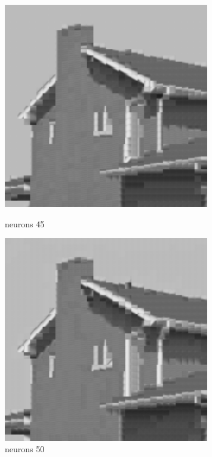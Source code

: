 \documentclass[../IDP_Task5_Karwowski_Kowalewski.tex]{subfiles}
\begin{document}
{{        \begin{figure}[!htbp]
            \begin{minipage}[c]{0.45\linewidth}
                \centering
                \includegraphics[width=0.8\textwidth]{img/kowalewski/crop_size_8_neurons_45.png}
                \caption{neurons 45}
            \end{minipage}\hfill
            \begin{minipage}[c]{0.45\linewidth}
                \centering
                \includegraphics[width=0.8\textwidth]{img/kowalewski/crop_size_8_neurons_50.png}
                \caption{neurons 50}
            \end{minipage}
        \end{figure}

}}
\end{document}
